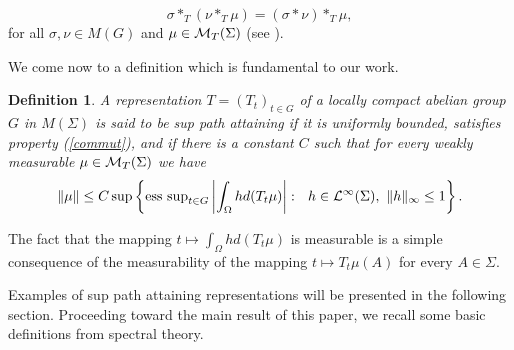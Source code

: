 \documentclass[12pt]{article}
\renewcommand{\O}{\Omega}
\newcommand{\cL}{{\cal L}}
\newcommand{\cMT}{{\cal M}_T(\Sigma)}
\newtheorem{defin}{Definition}[section]
\begin{document}
\begin{equation} 
\sigma*_T(\nu*_T\mu)=(\sigma*\nu)*_T\mu,
\label{associative}
\end{equation}
for all $\sigma , \nu \in M(G)$ and $\mu \in \cMT$
(see \cite{ams2}).



We come now to a definition which is fundamental to our work.
\begin{defin}
A representation $T=(T_t)_{t\in G}$ of a locally compact abelian group
$G$ in $M(\Sigma)$ is said to be sup path attaining
if it is uniformly bounded, satisfies property (\ref{commut}), and if there 
is a constant $C$ such that for every weakly 
measurable $\mu\in {\cal M}_T(\Sigma)$ we have
\begin{equation}
\| \mu\| \leq C\sup \left\{
{\rm ess\ sup}_{t\in G} \left|
\int_\O h d (T_t\mu)
\right|
:\ \ h\in \cL^\infty(\Sigma),\ \|h\|_\infty\leq 1
\right\}.
\label{ineqhypa}
\end{equation}
\label{hypa}
\end{defin}

The fact that the mapping $t\mapsto \int_\O h d (T_t\mu)$ is 
measurable is a simple consequence of
the measurability of the mapping $t\mapsto T_t\mu(A)$ for every
$A\in\Sigma$.  

Examples of  sup path attaining representations 
 will be presented in the following section.  
Proceeding toward the main result of this paper, we 
recall some basic definitions from spectral theory.

 
\end{document}
